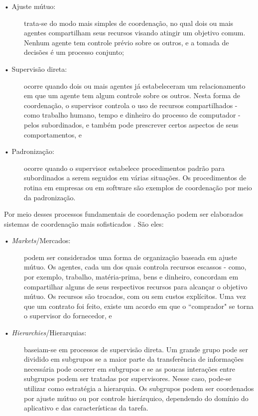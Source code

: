 \begin{description}
    \item[• Ajuste mútuo:] trata-se do modo mais simples de coordenação, no qual dois ou mais agentes compartilham seus recursos visando atingir um objetivo comum. Nenhum agente tem controle prévio sobre os outros, e a tomada de decisões é um processo conjunto;
    \item[• Supervisão direta:] ocorre quando dois ou mais agentes já estabeleceram um relacionamento em que um agente tem algum controle sobre os outros. Nesta forma de coordenação, o supervisor controla o uso de recursos compartilhados - como trabalho humano, tempo e dinheiro do processo de computador - pelos subordinados, e também pode prescrever certos aspectos de seus comportamentos, e
    \item[• Padronização:] ocorre quando o supervisor estabelece procedimentos padrão para subordinados a serem seguidos em várias situações. Os procedimentos de rotina em empresas ou em software são exemplos de coordenação por meio da padronização.
\end{description}

Por meio desses processos fundamentais de coordenação podem ser elaborados sistemas de coordenação mais sofisticados \cite[pág. 63]{malone1990organizing}. São eles:

\begin{description}
    \item[• \textit{Markets}/Mercados:] podem ser considerados uma forma de organização baseada em ajuste mútuo. Os agentes, cada um dos quais controla recursos escassos - como, por exemplo, trabalho, matéria-prima, bens e dinheiro, concordam em compartilhar alguns de seus respectivos recursos para alcançar o objetivo mútuo. Os recursos são trocados, com ou sem custos explícitos. Uma vez que um contrato foi feito, existe um acordo em que o ``comprador"  se torna o supervisor do fornecedor, e
    \item[• \textit{Hierarchies}/Hierarquias:] baseiam-se em processos de supervisão direta. Um grande grupo pode ser dividido em subgrupos se a maior parte da transferência de informações necessária pode ocorrer em subgrupos e se as poucas interações entre subgrupos podem ser tratadas por supervisores. Nesse caso, pode-se utilizar como estratégia a hierarquia. Os subgrupos podem ser coordenados por ajuste mútuo ou por controle hierárquico, dependendo do domínio do aplicativo e das características da tarefa.
\end{description}

